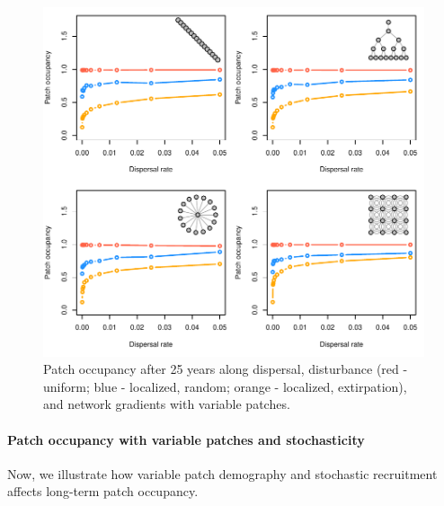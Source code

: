 \documentclass[
]{article}
\begin{document}
\begin{figure}[H]

{\centering \includegraphics{Managing_for_ecological_surprises_in_metapopulations_files/figure-latex/patch occupancy with variable patches-1} 

}

\caption{Patch occupancy after 25 years along  dispersal, disturbance (red - uniform; blue - localized, random; orange - localized, extirpation), and network gradients with variable patches.}\label{fig:patch occupancy with variable patches}
\end{figure}
\newpage

\hypertarget{patch-occupancy-with-variable-patches-and-stochasticity}{%
\paragraph{Patch occupancy with variable patches and
stochasticity}\label{patch-occupancy-with-variable-patches-and-stochasticity}}

Now, we illustrate how variable patch demography and stochastic
recruitment affects long-term patch occupancy.
\end{document}
